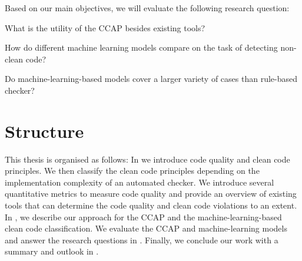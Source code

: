 Based on our main objectives, we will evaluate the following research question:
\begin{description}
    \setlength{\itemsep}{1pt}
    \item[RQ1:] What is the utility of the CCAP besides existing tools? 
    \item[RQ2:] How do different machine learning models compare on the task of detecting non-clean code?
    \item[RQ3:] Do machine-learning-based models cover a larger variety of cases than rule-based checker? 
\end{description}


\section{Structure}
This thesis is organised as follows: In  we introduce code quality and clean code principles. We then classify the clean code principles depending on the implementation complexity of an automated checker. We introduce several quantitative metrics to measure code quality and provide an overview of existing tools that can determine the code quality and clean code violations to an extent. 
In , we describe our approach for the CCAP and the machine-learning-based clean code classification. We evaluate the CCAP and machine-learning models and answer the research questions in . Finally, we conclude our work with a summary and outlook in .